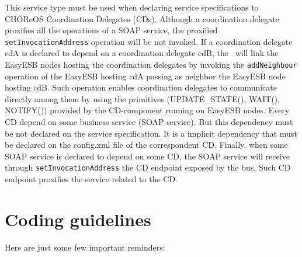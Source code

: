This service type must be used when declaring service specifications to CHOReOS Coordination Delegates (CDs).
Although a coordination delegate proxifies all the operations of a SOAP service, the proxified \texttt{setInvocationAddress}
operation will be not invoked. If a coordination delegate cdA is declared to depend on a coordination delegate cdB,
the \ee\ will link the EasyESB nodes hosting the coordination delegates by invoking the \texttt{addNeighbour} operation of the EasyESB
hosting cdA passing as neighbor the EasyESB node hosting cdB. Such operation enables coordination delegates to communicate directly among them
by using the primitives (UPDATE\_STATE(), WAIT(), NOTIFY()) provided by the CD-component running on EasyESB nodes.
Every CD depend on some business service (SOAP service). But this dependency must be not declared on the service specification.
It is a implicit dependency that must be declared on the config.xml file of the correspondent CD.
Finally, when some SOAP service is declared to depend on some CD, the SOAP service will receive through \texttt{setInvocationAddress} the CD endpoint exposed by the bus. Such CD endpoint proxifies the service related to the CD.


\section{Coding guidelines}

Here are just some few important reminders:

